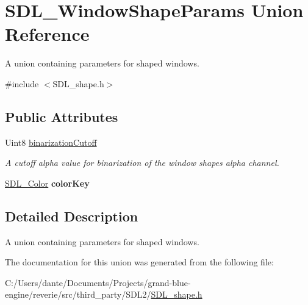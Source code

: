 \hypertarget{union_s_d_l___window_shape_params}{}\section{S\+D\+L\+\_\+\+Window\+Shape\+Params Union Reference}
\label{union_s_d_l___window_shape_params}


A union containing parameters for shaped windows.  




{\ttfamily \#include $<$S\+D\+L\+\_\+shape.\+h$>$}

\subsection*{Public Attributes}
\begin{DoxyCompactItemize}
\item 
\mbox{\label{union_s_d_l___window_shape_params_a534c40b09588a8075c0a70227753dc56}} 
Uint8 \mbox{\hyperlink{union_s_d_l___window_shape_params_a534c40b09588a8075c0a70227753dc56}{binarization\+Cutoff}}
\begin{DoxyCompactList}\small\item\em A cutoff alpha value for binarization of the window shape\textquotesingle{}s alpha channel. \end{DoxyCompactList}\item 
\mbox{\label{union_s_d_l___window_shape_params_a8bf3e442a51a1bbf452cfec7c1ed5318}} 
\mbox{\hyperlink{struct_s_d_l___color}{S\+D\+L\+\_\+\+Color}} {\bfseries color\+Key}
\end{DoxyCompactItemize}


\subsection{Detailed Description}
A union containing parameters for shaped windows. 

The documentation for this union was generated from the following file\+:\begin{DoxyCompactItemize}
\item 
C\+:/\+Users/dante/\+Documents/\+Projects/grand-\/blue-\/engine/reverie/src/third\+\_\+party/\+S\+D\+L2/\mbox{\hyperlink{_s_d_l__shape_8h}{S\+D\+L\+\_\+shape.\+h}}\end{DoxyCompactItemize}
